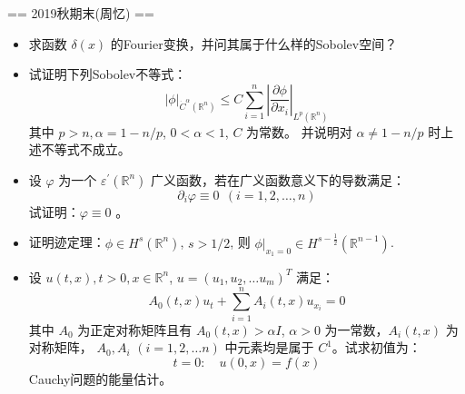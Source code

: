== 2019秋期末(周忆) ==
\begin{itemize}
    \item[一] 求函数 $\delta(x)$ 的Fourier变换，并问其属于什么样的Sobolev空间？
    \item[二] 试证明下列Sobolev不等式：
    $$|\phi|_{\dot{C}^{\alpha}\left(\mathbb{R}^{n}\right)} 
    \leq C \sum_{i=1}^{n}\left|\frac{\partial \phi}{\partial x_{i}}\right|_{L^{p}\left(\mathbb{R}^{n}\right)}$$
    其中 $p>n, \alpha=1-n/p$, $0<\alpha<1$, $C$ 为常数。 
    并说明对 $\alpha \neq 1-n/p$ 时上述不等式不成立。
    \item[三] 设 $\varphi$ 为一个 $\varepsilon^{\prime}(\mathbb{R}^{n})$ 广义函数，若在广义函数意义下的导数满足：
    $$\partial_{i} \varphi \equiv 0\ \ (i=1,2, \ldots, n)$$
    试证明：$\varphi \equiv 0$ 。
    \item[四] 证明迹定理：$\phi \in H^{s}(\mathbb{R}^{n})$, $s>1/2$, 
    则 $\left.\phi\right|_{x_{1}=0} \in H^{s-\frac{1}{2}}(\mathbb{R}^{n-1})$.
    \item[五] 设 $u(t, x), t>0, x \in \mathbb{R}^{n}$, 
    $u=(u_{1}, u_{2}, \ldots u_{m})^{T}$ 满足：
    $$A_{0}(t, x) u_{t}+\sum_{i=1}^{n} A_{i}(t, x) u_{x_{i}}=0$$
    其中 $A_{0}$ 为正定对称矩阵且有 $A_{0}(t, x)>\alpha I$, 
    $\alpha>0$ 为一常数，$A_{i}(t, x)$ 为对称矩阵，
    $A_{0}, A_{i}$ $(i=1,2, \ldots n)$ 中元素均是属于 $C^{1}$。试求初值为：
    $$t=0: \quad u(0, x)=f(x)$$
    Cauchy问题的能量估计。
\end{itemize}
